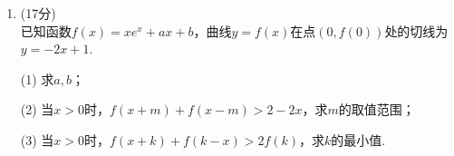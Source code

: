 \documentclass[12pt,a4paper]{article}
\begin{document}
\begin{enumerate}[leftmargin=*,label=\arabic*.,resume,itemsep=1.2ex]
		\hspace*{2em}(ii) $M$是否有中心点？当$t_0$为何值时，$M$有中心点？当$M$有中心点时，平移$M$到$M'$，使$O$为$M'$的中心点，说明$M'$的形状.
		
		\newpage
		\item (17分)\\
		已知函数$f(x)=xe^x+ax+b$，曲线$y=f(x)$在点$(0,f(0))$处的切线为$y=-2x+1$.
		
		(1) 求$a,b$；
		
		(2) 当$x>0$时，$f(x+m)+f(x-m)>2-2x$，求$m$的取值范围；
		
		(3) 当$x>0$时，$f(x+k)+f(k-x)>2f(k)$，求$k$的最小值.
		
		\vspace{0.9\textheight}
	\end{enumerate}
\end{document}
